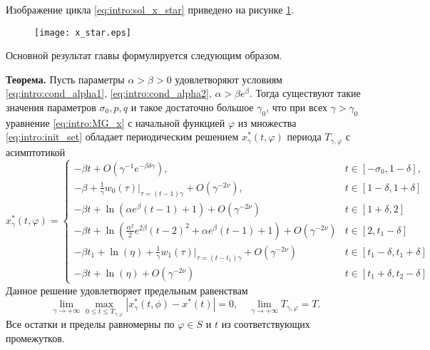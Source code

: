Изображение цикла \eqref{eq:intro:sol_x_star} приведено на рисунке \ref{fig:intro:x_star:ch1}.

\begin{figure}
	\centering
	\texttt{[image: x\_star.eps]}
	\label{fig:intro:x_star:ch1}
\end{figure}

Основной результат главы формулируется следующим образом.
	
\bigskip

\textbf{Теорема.} Пусть параметры $\alpha > \beta > 0$ удовлетворяют условиям \eqref{eq:intro:cond_alpha1}, \eqref{eq:intro:cond_alpha2}, $\alpha > \beta e^{\beta}$. Тогда существуют такие значения параметров $\sigma_0, p, q$ и такое достаточно большое $\gamma_0$, что при всех $\gamma > \gamma_0$ уравнение \eqref{eq:intro:MG_x} с начальной функцией $\varphi$ из множества \eqref{eq:intro:init_set} обладает периодическим решением $x^*_\gamma(t, \varphi)$ периода $T_{\gamma, \varphi}$ с асимптотикой
\footnotesize
\begin{equation}
	\label{eq:intro:sol_x*gamma}
	x^*_\gamma(t, \varphi)= 
	\begin{cases}
		- \beta t + O(\gamma^{-1} e^{-\beta \delta \gamma}), & t\in[-\sigma_0, 1 - \delta],\\
		-\beta + \frac{1}{\gamma} w_0(\tau)|_{\tau=(t - 1)\gamma} + O(\gamma^{-2\nu}), & t \in [1 - \delta,1 + \delta]\\
		- \beta t + \ln(\alpha e^{\beta}(t - 1) + 1) + O(\gamma^{-2\nu}) & t\in[1 + \delta, 2]\\
		- \beta t + \ln(\frac{\alpha^2}{2}e^{2 \beta}(t - 2)^2 + \alpha e^{\beta}(t - 1) + 1) + O(\gamma^{-2\nu}) & t \in [2, t_1 - \delta]\\
		- \beta t_1 + \ln(\eta)+\frac{1}{\gamma} w_1(\tau)|_{\tau=(t - t_1)\gamma} + O(\gamma^{-2\nu}) & t\in[t_1 - \delta, t_1  +\delta]\\
		- \beta t + \ln(\eta) + O(\gamma^{-2\nu}) & t \in [t_1 + \delta, t_2 - \delta]
	\end{cases}
\end{equation}
\normalsize
%
Данное решение удовлетворяет предельным равенствам 
%
\begin{equation}
	\label{eq:intro:lim_x*}
	\lim_{\gamma\to+\infty}\max_{0\leqslant t\leqslant T_{\gamma, \varphi}}|x_{\gamma}^*(t, \phi)-x^*(t)|=0,\quad \lim_{\gamma\to+\infty}T_{\gamma, \varphi} = T.
\end{equation}
Все остатки и пределы равномерны по $\varphi \in S$ и $t$ из соответствующих промежутков.

